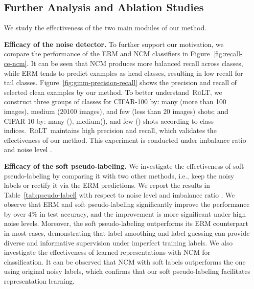 \documentclass{article}
\def\algo{{\textsc{RoLT}}}
\begin{document}
\subsection{Further Analysis and Ablation Studies}
We study the effectiveness of the two main modules of our method.

\textbf{Efficacy of the noise detector.}
To further support our motivation, we compare the performance of the ERM and NCM classifiers in Figure~\ref{fig:recall-ce-ncm}. It can be seen that NCM produces more balanced recall across classes, while ERM tends to predict examples as head classes, resulting in low recall for tail classes. Figure~\ref{fig:gmm-precision-recall} shows the precision and recall of selected clean examples by our method. To better understand~\algo, we construct three groups of classes for CIFAR-100 by: many (more than 100 images), medium (20100 images), and few (less than 20 images) shots; and CIFAR-10 by: many (), medium(), and few () shots according to class indices.~\algo~maintains high precision and recall, which validates the effectiveness of our method. This experiment is conducted under imbalance ratio  and noise level .

\textbf{Efficacy of the soft pseudo-labeling.}
We investigate the effectiveness of soft pseudo-labeling by comparing it with two other methods, i.e., keep the noisy labels or rectify it via the ERM predictions. We report the results in Table~\ref{tab:pseudo-label} with respect to noise level  and imbalance ratio . We observe that ERM and soft pseudo-labeling significantly improve the performance by over 4\% in test accuracy, and the improvement is more significant under high noise levels. Moreover, the soft pseudo-labeling outperforms its ERM counterpart in most cases, demonstrating that label smoothing and label guessing can provide diverse and informative supervision under imperfect training labels. We also investigate the effectiveness of learned representations with NCM for classification. It can be observed that NCM with soft labels outperforms the one using original noisy labels, which confirms that our soft pseudo-labeling facilitates representation learning.
\end{document}

